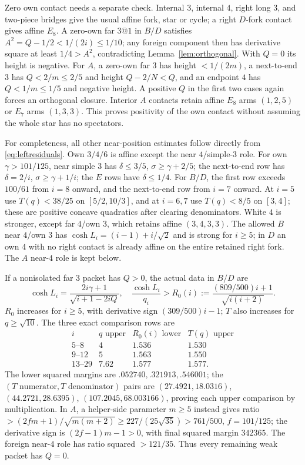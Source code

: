 \documentclass[11pt]{article}
\theoremstyle{remark}
\begin{document}
Zero own contact needs a separate check. Internal $3$, internal $4$,
right long $3$, and two-piece bridges give the usual affine fork,
star or cycle; a right $D$-fork contact gives affine $E_8$.
A zero-own far $3@1$ in $B/D$ satisfies
$A^2=Q-1/2<1/(2i)\le1/10$; any foreign component then has
derivative square at least $1/4>A^2$, contradicting
Lemma~\ref{lem:orthogonal}. With $Q=0$ its height is negative.
For $A$, a zero-own far $3$ has height $<1/(2m)$, a next-to-end
$3$ has $Q<2/m\le2/5$ and height $Q-2/N<Q$, and an endpoint
$4$ has $Q<1/m\le1/5$ and negative height. A positive $Q$ in
the first two cases again forces an orthogonal closure. Interior
$A$ contacts retain affine $E_8$ arms $(1,2,5)$ or $E_7$ arms
$(1,3,3)$. This proves positivity of the own contact without
assuming the whole star has no spectators.

For completeness, all other near-position estimates follow directly
from \eqref{eq:leftresiduals}. Own $3/4/6$ is affine except the
near $4$/simple-$3$ role. For own $\gamma>101/125$, near simple
$3$ has $\delta\le3/5$, $\sigma\ge\gamma+2/5$;
the next-to-end row has $\delta=2/i$, $\sigma\ge\gamma+1/i$;
the $E$ rows have $\delta\le1/4$.
For $B/D$, the first row exceeds $100/61$ from $i=8$ onward,
and the next-to-end row from $i=7$ onward. At $i=5$ use
$T(q)<38/25$ on $[5/2,10/3]$, and at $i=6,7$ use
$T(q)<8/5$ on $[3,4]$; these are positive concave quadratics
after clearing denominators. White $4$ is stronger, except far
$4$/own $3$, which retains affine $(3,4,3,3)$.
The allowed $B$ near $4$/own $3$ has
$\cosh L_i=(i-1)+i/\sqrt2$ and is strong for $i\ge5$;
in $D$ an own $4$ with no right contact is already affine on the
entire retained right fork. The $A$ near-$4$ role is kept below.

If a nonisolated far $3$ packet has $Q>0$, the actual data in $B/D$ are
\[
 \cosh L_i=\frac{2i\gamma+1}{\sqrt{i+1-2iQ}},\quad
 \frac{\cosh L_i}{q_i}>R_0(i)
 :=\frac{(809/500)i+1}{\sqrt{i(i+2)}}.
\]
$R_0$ increases for $i\ge5$, with derivative sign
$(309/500)i-1$; $T$ also increases for $q\ge\sqrt{10}$.
The three exact comparison rows are
\[
\begin{array}{c|c|c|c}
i&q\text{ upper}&R_0(i)\text{ lower}&T(q)\text{ upper}\\ \hline
5\text{--}8&4&1.536&1.530\\
9\text{--}12&5&1.563&1.550\\
13\text{--}29&7.62&1.577&1.577.
\end{array}
\]
The lower squared margins are $.052740,.321913,.546001$;
the $(T\text{ numerator},T\text{ denominator})$ pairs are
$(27.4921,18.0316)$, $(44.2721,28.6395)$,
$(107.2045,68.003166)$, proving each upper comparison by
multiplication. In $A$, a helper-side parameter $m\ge5$ instead
gives ratio $>(2fm+1)/\sqrt{m(m+2)}\ge227/(25\sqrt{35})>
761/500$, $f=101/125$; the derivative sign is
$(2f-1)m-1>0$, with final squared margin $342365$.
The foreign near-$4$ role has ratio squared $>121/35$.
Thus every remaining weak packet has $Q=0$.
\end{document}
